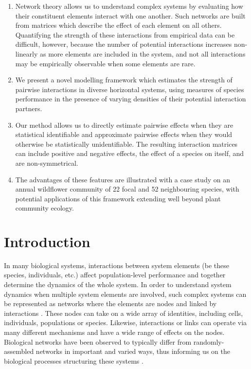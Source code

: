 \documentclass[a4,12pt]{article}
\begin{document}
    \begin{enumerate}
    \item{Network theory allows us to understand complex systems by evaluating how their constituent elements interact with one another. Such networks are built from matrices which describe the effect of each element on all others. Quantifying the strength of these interactions from empirical data can be difficult, however, because the number of potential interactions increases non-linearly as more elements are included in the system, and not all interactions may be empirically observable when some elements are rare.}
    \item{We present a novel modelling framework which estimates the strength of pairwise interactions in diverse horizontal systems, using measures of species performance in the presence of varying densities of their potential interaction partners.}
    \item{Our method allows us to directly estimate pairwise effects when they are statistical identifiable and approximate pairwise effects when they would otherwise be statistically unidentifiable. The resulting interaction matrices can include positive and negative effects, the effect of a species on itself, and are non-symmetrical.} 
    \item{The advantages of these features are illustrated with a case study on an annual wildflower community of 22 focal and 52 neighbouring species, with potential applications of this framework extending well beyond plant community ecology.}
\end{enumerate}

\section{Introduction}

    
    \paragraph{}
    In many biological systems, interactions between system elements (be these species, individuals, etc.) affect population-level performance and together determine the dynamics of the whole system. In order to understand system dynamics when multiple system elements are involved, such complex systems can be represented as networks where the elements are nodes and linked by interactions \parencite{Pimm1978}. These nodes can take on a wide array of identities, including cells, individuals, populations or species. Likewise, interactions or links can operate via many different mechanisms and have a wide range of effects on the nodes. Biological networks have been observed to typically differ from randomly-assembled networks in important and varied ways, thus informing us on the biological processes structuring these systems \parencite{Dunne2002, Kinlock2019}.
\end{document}
